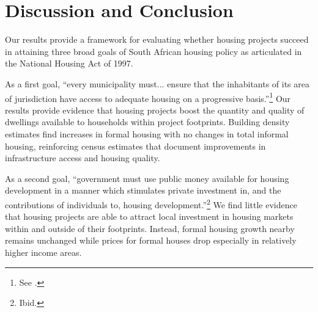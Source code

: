 \documentclass[12pt]{article}
\begin{document}







\section{Discussion and Conclusion}\label{section:discussion}


Our results provide a framework for evaluating whether housing projects succeed in attaining three broad goals of South African housing policy as articulated in the National Housing Act of 1997.

As a first goal, ``every municipality must... ensure that the inhabitants of its area of jurisdiction have access to adequate housing on a progressive basis.''\footnote{See \cite{housingact}.}  Our results provide evidence that housing projects boost the quantity and quality of dwellings available to households within project footprints.  Building density estimates find increases in formal housing with no changes in total informal housing, reinforcing census estimates that document improvements in infrastructure access and housing quality.

As a second goal, ``government must use public money available for housing development in a manner which stimulates private investment in, and the contributions of individuals to, housing development.''\footnote{Ibid.}    We find little evidence that housing projects are able to attract local investment in housing markets within and outside of their footprints.  Instead, formal housing growth nearby remains unchanged while prices for formal houses drop especially in relatively higher income areas.
\end{document}
